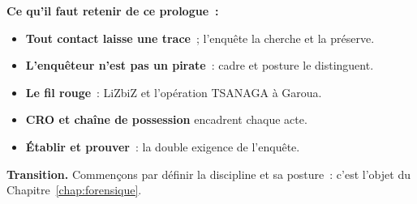 \separateur

\begin{boxresume}
\textbf{Ce qu'il faut retenir de ce prologue~:}
\begin{itemize}
    \item \textbf{Tout contact laisse une trace}~; l'enquête la cherche et la
          préserve.
    \item \textbf{L'enquêteur n'est pas un pirate}~: cadre et posture le
          distinguent.
    \item \textbf{Le fil rouge}~: LiZbiZ et l'opération TSANAGA à Garoua.
    \item \textbf{CRO et chaîne de possession} encadrent chaque acte.
    \item \textbf{Établir et prouver}~: la double exigence de l'enquête.
\end{itemize}
\end{boxresume}

\begin{boxinfo}
\textbf{Transition.} Commençons par définir la discipline et sa posture~:
c'est l'objet du Chapitre~\ref{chap:forensique}.
\end{boxinfo}
